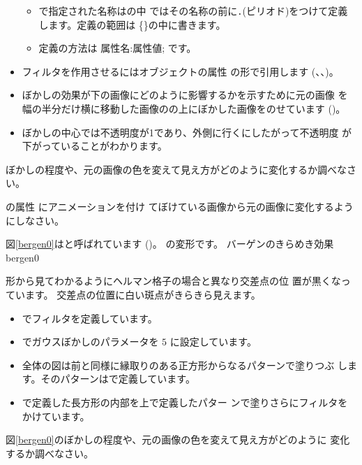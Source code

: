 \begin{itemize}
\begin{itemize}
 \item {}で指定された名称はの中
 ではその名称の前に\texttt{.}(ピリオド)をつけて定義します。定義の範囲は
 \{\}の中に書きます。
 \item 定義の方法は 属性名:属性値; です。
\end{itemize}
 \item フィルタを作用させるにはオブジェクトの属性
 の形で引用します
    (、、)。
 \item ぼかしの効果が下の画像にどのように影響するかを示すために元の画像
 を幅の半分だけ横に移動した画像のの上にぼかした画像をのせています
       ()。
 \item ぼかしの中心では不透明度が1であり、外側に行くにしたがって不透明度
 が下がっていることがわかります。
\end{itemize}
\begin{Problem}
ぼかしの程度や、元の画像の色を変えて見え方がどのように変化するか調べなさ
 い。
\end{Problem}
\begin{Problem}
 の属性 にアニメーションを付け
 てぼけている画像から元の画像に変化するようにしなさい。
\end{Problem}
図\ref{bergen0}はと呼ばれています
(\cite[182ページ図17.1]{Ninio})。
の変形です。
    {バーゲンのきらめき効果}{bergen0}

形から見てわかるようにヘルマン格子の場合と異なり交差点の位
置が黒くなっています。
交差点の位置に白い斑点がきらきら見えます。
\begin{itemize}
 \item {}でフィルタを定義しています。
 \item {}でガウスぼかしのパラメータを $5$ に設定しています。
 \item 全体の図は前と同様に縁取りのある正方形からなるパターンで塗りつぶ
       します。そのパターンはで定義しています。
 \item {}で定義した長方形の内部を上で定義したパター
       ンで塗りさらにフィルタをかけています。
\end{itemize}
\begin{Problem}\upshape
図\ref{bergen0}のぼかしの程度や、元の画像の色を変えて見え方がどのように
 変化するか調べなさい。
\end{Problem}

